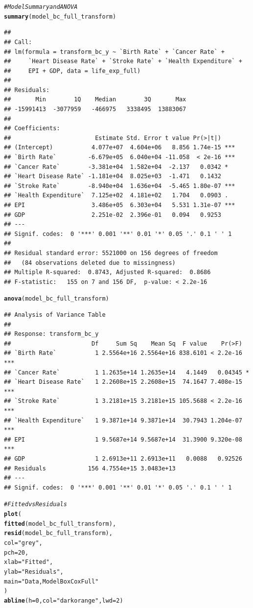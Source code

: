 \documentclass{article}\usepackage[]{graphicx}\usepackage[]{color}
\makeatletter
\newcommand{\hlnum}[1]{\textcolor[rgb]{0.686,0.059,0.569}{#1}}%
\newcommand{\hlstr}[1]{\textcolor[rgb]{0.192,0.494,0.8}{#1}}%
\newcommand{\hlcom}[1]{\textcolor[rgb]{0.678,0.584,0.686}{\textit{#1}}}%
\newcommand{\hlstd}[1]{\textcolor[rgb]{0.345,0.345,0.345}{#1}}%
\newcommand{\hlkwc}[1]{\textcolor[rgb]{0.333,0.667,0.333}{#1}}%
\newcommand{\hlkwd}[1]{\textcolor[rgb]{0.737,0.353,0.396}{\textbf{#1}}}%
\newenvironment{kframe}{%
 \def\at@end@of@kframe{}%
 \ifinner\ifhmode%
  \def\at@end@of@kframe{\end{minipage}}%
  \begin{minipage}{\columnwidth}%
 \fi\fi%
 \def\FrameCommand##1{\hskip\@totalleftmargin \hskip-\fboxsep
 \colorbox{shadecolor}{##1}\hskip-\fboxsep
     \hskip-\linewidth \hskip-\@totalleftmargin \hskip\columnwidth}%
 \MakeFramed {\advance\hsize-\width
   \@totalleftmargin\z@ \linewidth\hsize
   \@setminipage}}%
 {\par\unskip\endMakeFramed%
 \at@end@of@kframe}
\newenvironment{knitrout}{}{} %
\makeatother
\begin{document}
\begin{knitrout}
\begin{kframe}
\begin{alltt}
\hlcom{# Model Summary and ANOVA}
\hlkwd{summary}\hlstd{(model_bc_full_transform)}
\end{alltt}
\begin{verbatim}
## 
## Call:
## lm(formula = transform_bc_y ~ `Birth Rate` + `Cancer Rate` + 
##     `Heart Disease Rate` + `Stroke Rate` + `Health Expenditure` + 
##     EPI + GDP, data = life_exp_full)
## 
## Residuals:
##       Min        1Q    Median        3Q       Max 
## -15991413  -3077959   -466975   3338495  13883067 
## 
## Coefficients:
##                        Estimate Std. Error t value Pr(>|t|)    
## (Intercept)           4.077e+07  4.604e+06   8.856 1.74e-15 ***
## `Birth Rate`         -6.679e+05  6.040e+04 -11.058  < 2e-16 ***
## `Cancer Rate`        -3.381e+04  1.582e+04  -2.137   0.0342 *  
## `Heart Disease Rate` -1.181e+04  8.025e+03  -1.471   0.1432    
## `Stroke Rate`        -8.940e+04  1.636e+04  -5.465 1.80e-07 ***
## `Health Expenditure`  7.125e+02  4.181e+02   1.704   0.0903 .  
## EPI                   3.486e+05  6.303e+04   5.531 1.31e-07 ***
## GDP                   2.251e-02  2.396e-01   0.094   0.9253    
## ---
## Signif. codes:  0 '***' 0.001 '**' 0.01 '*' 0.05 '.' 0.1 ' ' 1
## 
## Residual standard error: 5521000 on 156 degrees of freedom
##   (84 observations deleted due to missingness)
## Multiple R-squared:  0.8743,	Adjusted R-squared:  0.8686 
## F-statistic:   155 on 7 and 156 DF,  p-value: < 2.2e-16
\end{verbatim}
\begin{alltt}
\hlkwd{anova}\hlstd{(model_bc_full_transform)}
\end{alltt}
\begin{verbatim}
## Analysis of Variance Table
## 
## Response: transform_bc_y
##                       Df     Sum Sq    Mean Sq  F value    Pr(>F)    
## `Birth Rate`           1 2.5564e+16 2.5564e+16 838.6101 < 2.2e-16 ***
## `Cancer Rate`          1 1.2635e+14 1.2635e+14   4.1449   0.04345 *  
## `Heart Disease Rate`   1 2.2608e+15 2.2608e+15  74.1647 7.408e-15 ***
## `Stroke Rate`          1 3.2181e+15 3.2181e+15 105.5688 < 2.2e-16 ***
## `Health Expenditure`   1 9.3871e+14 9.3871e+14  30.7943 1.204e-07 ***
## EPI                    1 9.5687e+14 9.5687e+14  31.3900 9.320e-08 ***
## GDP                    1 2.6913e+11 2.6913e+11   0.0088   0.92526    
## Residuals            156 4.7554e+15 3.0483e+13                       
## ---
## Signif. codes:  0 '***' 0.001 '**' 0.01 '*' 0.05 '.' 0.1 ' ' 1
\end{verbatim}
\begin{alltt}
\hlcom{# Fitted vs Residuals}
\hlkwd{plot}\hlstd{(}
  \hlkwd{fitted}\hlstd{(model_bc_full_transform),}
  \hlkwd{resid}\hlstd{(model_bc_full_transform),}
  \hlkwc{col} \hlstd{=} \hlstr{"grey"}\hlstd{,}
  \hlkwc{pch} \hlstd{=} \hlnum{20}\hlstd{,}
  \hlkwc{xlab} \hlstd{=} \hlstr{"Fitted"}\hlstd{,}
  \hlkwc{ylab} \hlstd{=} \hlstr{"Residuals"}\hlstd{,}
  \hlkwc{main} \hlstd{=} \hlstr{"Data, Model Box Cox Full"}
\hlstd{)}
\hlkwd{abline}\hlstd{(}\hlkwc{h} \hlstd{=} \hlnum{0}\hlstd{,} \hlkwc{col} \hlstd{=} \hlstr{"darkorange"}\hlstd{,} \hlkwc{lwd} \hlstd{=} \hlnum{2}\hlstd{)}
\end{alltt}
\end{kframe}


\end{knitrout}
\end{document}
